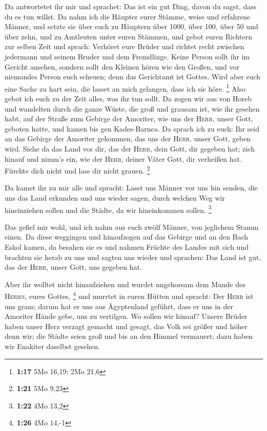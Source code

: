  Da antwortetet ihr mir und sprachet: Das ist ein gut
Ding, davon du sagst, dass du es tun willst.  Da nahm ich
die Häupter eurer Stämme, weise und erfahrene Männer, und setzte sie
über euch zu Häuptern über 1000, über 100, über 50 und über zehn, und zu
Amtleuten unter euren Stämmen,  und gebot euren Richtern
zur selben Zeit und sprach: Verhöret eure Brüder und richtet recht
zwischen jedermann und seinem Bruder und dem Fremdlinge. 
Keine Person sollt ihr im Gericht ansehen, sondern sollt den Kleinen
hören wie den Großen, und vor niemandes Person euch scheuen; denn das
Gerichtamt ist Gottes. Wird aber euch eine Sache zu hart sein, die
lasset an mich gelangen, dass ich sie höre. \footnote{\textbf{1:17} 5Mo
  16,19; 2Mo 21,6}  Also gebot ich euch zu der Zeit
alles, was ihr tun sollt.  Da zogen wir aus von Horeb und
wandelten durch die ganze Wüste, die groß und grausam ist, wie ihr
gesehen habt, auf der Straße zum Gebirge der Amoriter, wie uns der
\textsc{Herr}, unser Gott, geboten hatte, und kamen bis gen
Kades-Barnea.  Da sprach ich zu euch: Ihr seid an das
Gebirge der Amoriter gekommen, das uns der \textsc{Herr}, unser Gott,
geben wird.  Siehe da das Land vor dir, das der
\textsc{Herr}, dein Gott, dir gegeben hat; zieh hinauf und nimm's ein,
wie der \textsc{Herr}, deiner Väter Gott, dir verheißen hat. Fürchte
dich nicht und lass dir nicht grauen. \footnote{\textbf{1:21} 5Mo 9,23}

 Da kamet ihr zu mir alle und spracht: Lasst uns Männer
vor uns hin senden, die uns das Land erkunden und uns wieder sagen,
durch welchen Weg wir hineinziehen sollen und die Städte, da wir
hineinkommen sollen. \footnote{\textbf{1:22} 4Mo 13,2}

 Das gefiel mir wohl, und ich nahm aus euch zwölf Männer,
von jeglichem Stamm einen.  Da diese weggingen und
hinaufzogen auf das Gebirge und an den Bach Eskol kamen, da besahen sie
es  und nahmen Früchte des Landes mit sich und brachten
sie herab zu uns und sagten uns wieder und sprachen: Das Land ist gut,
das der \textsc{Herr}, unser Gott, uns gegeben hat.

 Aber ihr wolltet nicht hinaufziehen und wurdet
ungehorsam dem Munde des \textsc{Herrn}, eures Gottes, \footnote{\textbf{1:26}
  4Mo 14,-1}  und murrtet in euren Hütten und spracht:
Der \textsc{Herr} ist uns gram; darum hat er uns aus Ägyptenland
geführt, dass er uns in der Amoriter Hände gebe, uns zu vertilgen.
 Wo sollen wir hinauf? Unsere Brüder haben unser Herz
verzagt gemacht und gesagt, das Volk sei größer und höher denn wir; die
Städte seien groß und bis an den Himmel vermauert; dazu haben wir
Enakiter daselbst gesehen.

